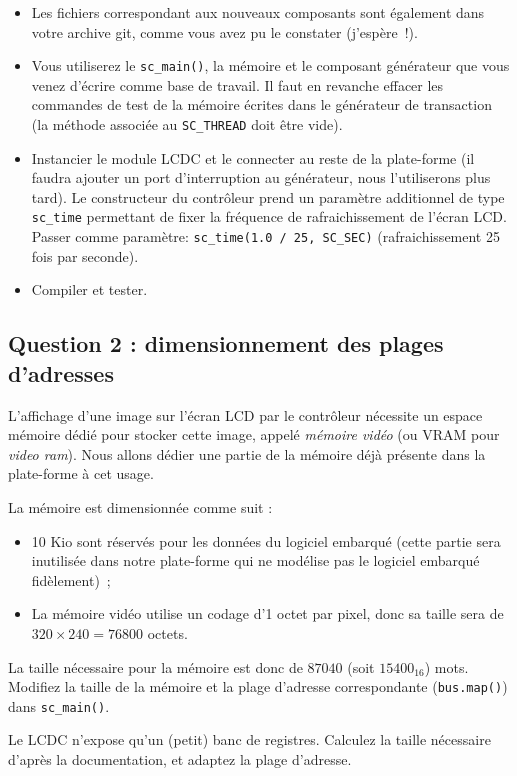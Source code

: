 \documentclass[12pt,a4paper]{article}
\begin{document}
\begin{itemize}
\item Les fichiers correspondant aux nouveaux composants sont également dans votre archive git, comme vous avez pu le constater (j'espère~!).
\item Vous utiliserez le \texttt{sc\_main()}, la mémoire et le composant générateur que vous venez d'écrire comme base de travail.
      Il faut en revanche effacer les commandes de test de la mémoire écrites dans le générateur de transaction (la méthode associée au \lstinline|SC_THREAD| doit être vide).
\item Instancier le module LCDC et le connecter au reste de la plate-forme (il faudra ajouter un port d'interruption au générateur, nous l'utiliserons plus tard).
      Le constructeur du contrôleur prend un paramètre additionnel de type \lstinline|sc_time| permettant de fixer la fréquence de rafraichissement de l'écran LCD.
      Passer comme paramètre: \lstinline|sc_time(1.0 / 25, SC_SEC)| (rafraichissement 25 fois par seconde).
\item Compiler et tester.
\end{itemize}

\subsection*{Question 2 : dimensionnement des plages d'adresses}

L'affichage d'une image sur l'écran LCD par le contrôleur nécessite un espace mémoire dédié pour stocker cette image, appelé \textit{mémoire vidéo} (ou VRAM pour \textit{video ram}).
Nous allons dédier une partie de la mémoire déjà présente dans la plate-forme à cet usage.

La mémoire est dimensionnée comme suit :
\begin{itemize}
\item 10 Kio sont réservés pour les données du logiciel embarqué (cette partie sera inutilisée dans notre plate-forme qui ne modélise pas le logiciel embarqué fidèlement)~;
\item La mémoire vidéo utilise un codage d'1 octet par pixel, donc sa taille sera de $320\times 240=76800$ octets.
\end{itemize}

La taille nécessaire pour la mémoire est donc de $87040$ (soit $15400_{16}$) mots.
Modifiez la taille de la mémoire et la plage d'adresse correspondante (\verb|bus.map()|) dans \verb|sc_main()|.

Le LCDC n'expose qu'un (petit) banc de registres.
Calculez la taille nécessaire d'après la documentation, et adaptez la plage d'adresse.
\end{document}

